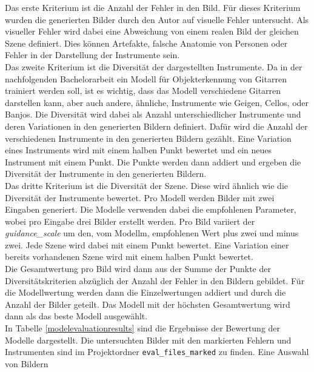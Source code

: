 Das erste Kriterium ist die Anzahl der Fehler in den Bild. Für dieses Kriterium wurden die generierten Bilder durch den Autor auf visuelle Fehler untersucht. Als visueller Fehler wird dabei eine Abweichung von einem realen Bild der gleichen Szene definiert. Dies können Artefakte, falsche Anatomie von Personen oder Fehler in der Darstellung der Instrumente sein.\\
Das zweite Kriterium ist die Diversität der dargestellten Instrumente. Da in der nachfolgenden Bachelorarbeit ein Modell für Objekterkennung von Gitarren trainiert werden soll, ist es wichtig, dass das Modell verschiedene Gitarren darstellen kann, aber auch andere, ähnliche, Instrumente wie Geigen, Cellos, oder Banjos. Die Diversität wird dabei als Anzahl unterschiedlicher Instrumente und deren Variationen in den generierten Bildern definiert. Dafür wird die Anzahl der verschiedenen Instrumente in den generierten Bildern gezählt. Eine Variation eines Instruments wird mit einem halben Punkt bewertet und ein neues Instrument mit einem Punkt. Die Punkte werden dann addiert und ergeben die Diversität der Instrumente in den generierten Bildern.\\
Das dritte Kriterium ist die Diversität der Szene. Diese wird ähnlich wie die Diversität der Instrumente bewertet. Pro Modell werden Bilder mit zwei Eingaben generiert. Die Modelle verwenden dabei die empfohlenen Parameter, wobei pro Eingabe drei Bilder erstellt werden. Pro Bild variiert der \emph{guidance\_scale} um den, vom Modellm, empfohlenen Wert plus zwei und minus zwei. Jede Szene wird dabei mit einem Punkt bewertet. Eine Variation einer bereits vorhandenen Szene wird mit einem halben Punkt bewertet.\\
Die Gesamtwertung pro Bild wird dann aus der Summe der Punkte der Diversitätskriterien abzüglich der Anzahl der Fehler in den Bildern gebildet. Für die Modellwertung werden dann die Einzelwertungen addiert und durch die Anzahl der Bilder geteilt. Das Modell mit der höchsten Gesamtwertung wird dann als das beste Modell ausgewählt.\\
In Tabelle \ref{modelevaluationresults} sind die Ergebnisse der Bewertung der Modelle dargestellt. Die untersuchten Bilder mit den markierten Fehlern und Instrumenten sind im Projektordner \texttt{eval\_files\_marked} zu finden. Eine Auswahl von Bildern 

